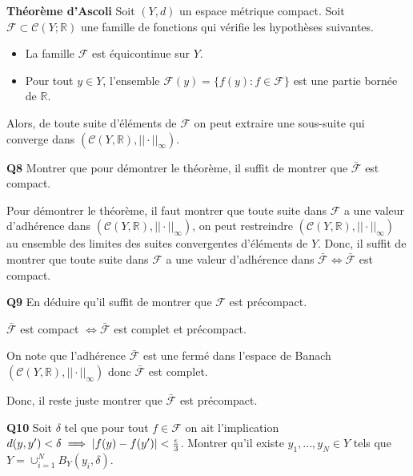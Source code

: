 \documentclass[french]{article}
\begin{document}
	\begin{tcolorbox}[colback=yellow!5!white,colframe=yellow!75!black]
		\textbf{\large{Théorème d'Ascoli}} Soit $(Y,d)$ un espace métrique compact. Soit $\mathcal{F} \subset \mathcal{C}(Y; \mathbb{R})$ une famille de fonctions qui vérifie les hypothèses suivantes.
		\begin{itemize}
			\item La famille $\mathcal{F}$ est équicontinue sur $Y$.
			\item Pour tout $y \in Y$, l'ensemble $\mathcal{F}(y) = \{f(y) : f \in \mathcal{F}\}$ est une partie bornée de $\mathbb{R}$.
		\end{itemize}
		Alors, de toute suite d'éléments de $\mathcal{F}$ on peut extraire une sous-suite qui converge dans $(\mathcal{C}(Y, \mathbb{R}), ||\cdot||_{\infty})$.
	\end{tcolorbox}
	
	\begin{tcolorbox}[colback=gray!5!white,colframe=gray!75!black]
		\textbf{\large{Q8}} Montrer que pour démontrer le théorème, il suffit de montrer que $\bar{\mathcal{F}}$ est compact.
	\end{tcolorbox}

	Pour démontrer le théorème, il faut montrer que toute suite dans $\mathcal{F}$ a une valeur d'adhérence dans $(\mathcal{C}(Y, \mathbb{R}), ||\cdot||_{\infty})$, on peut restreindre $(\mathcal{C}(Y, \mathbb{R}), ||\cdot||_{\infty})$ au ensemble des limites des suites convergentes d'éléments de $Y$. Donc, il suffit de montrer que toute suite dans $\mathcal{F}$ a une valeur d'adhérence dans $\bar{\mathcal{F}} \iff \bar{\mathcal{F}}$ est compact.

	\begin{tcolorbox}[colback=gray!5!white,colframe=gray!75!black]
		\textbf{\large{Q9}} En déduire qu'il suffit de montrer que $\mathcal{F}$ est précompact.
	\end{tcolorbox}

	$\bar{\mathcal{F}}$ est compact $\iff \bar{\mathcal{F}}$ est complet et précompact.
	
	On note que l'adhérence $\bar{\mathcal{F}}$ est une fermé dans l'espace de Banach $(\mathcal{C}(Y,\mathbb{R}), ||\cdot||_{\infty})$ donc $\bar{\mathcal{F}}$ est complet.
	
	Donc, il reste juste montrer que $\bar{\mathcal{F}}$ est précompact.

	\begin{tcolorbox}[colback=gray!5!white,colframe=gray!75!black]
		\textbf{\large{Q10}} Soit $\delta$ tel que pour tout $f \in \mathcal{F}$ on ait l'implication $d(y, y\sp{\prime}) < \delta \implies |f(y) - f(y\sp{\prime})| < \frac{\epsilon}{3}$. Montrer qu'il existe $y_1,...,y_N \in Y$ tels que $Y=\cup_{i=1}^{N}B_Y(y_i, \delta)$.
	\end{tcolorbox}
\end{document}
